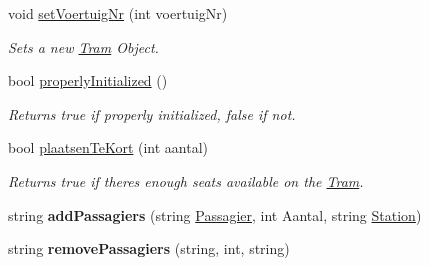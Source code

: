 \begin{DoxyCompactItemize}
void \hyperlink{classTram_a4912c2cd70ee32329220618068c28692}{set\+Voertuig\+Nr} (int voertuig\+Nr)
\begin{DoxyCompactList}\small\item\em Sets a new \hyperlink{classTram}{Tram} Object. \end{DoxyCompactList}\item 
bool \hyperlink{classTram_ac69cbbacaed7e1b9e60e608d766d02ee}{properly\+Initialized} ()
\begin{DoxyCompactList}\small\item\em Returns true if properly initialized, false if not. \end{DoxyCompactList}\item 
bool \hyperlink{classTram_acbd3c261e6b3830741de4e37643cc9cf}{plaatsen\+Te\+Kort} (int aantal)
\begin{DoxyCompactList}\small\item\em Returns true if there\textquotesingle{}s enough seats available on the \hyperlink{classTram}{Tram}. \end{DoxyCompactList}\item 
string {\bfseries add\+Passagiers} (string \hyperlink{classPassagier}{Passagier}, int Aantal, string \hyperlink{classStation}{Station})\hypertarget{classTram_a27f0c6832da5869a5173cc440fec9719}{}\label{classTram_a27f0c6832da5869a5173cc440fec9719}

\item 
string {\bfseries remove\+Passagiers} (string, int, string)\hypertarget{classTram_aefa8209a2667b653b56b0c48c801ed20}{}\label{classTram_aefa8209a2667b653b56b0c48c801ed20}


\end{DoxyCompactItemize}
